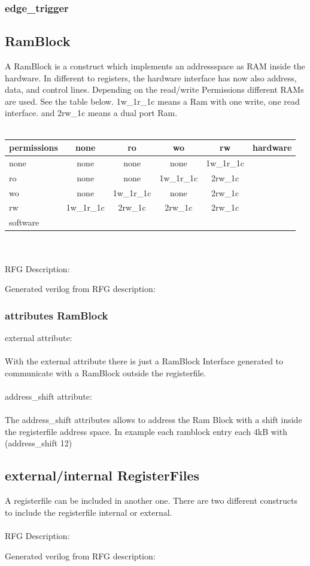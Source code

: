 \documentclass[12pt,a4paper]{article}
\begin{document}
\subsubsection{edge\_trigger}

\subsection{RamBlock}
A RamBlock is a construct which implements an addressspace as RAM inside the hardware. In different to registers, the hardware interface has now also address, data, and control lines. Depending on the read/write Permissions different RAMs are used. See the table below. 1w\_1r\_1c means a Ram with one write, one read interface. and 2rw\_1c means a dual port Ram.\\
\\
\begin{tabular}{ l || c | c | c | c | r }
    permissions & none & ro & wo & rw & hardware\\ \hline\hline
    none & none & none & none & 1w\_1r\_1c \\ \cline{1-5}
    ro & none & none & 1w\_1r\_1c& 2rw\_1c\\ \cline{1-5}
    wo & none & 1w\_1r\_1c& none & 2rw\_1c\\ \cline{1-5}
    rw & 1w\_1r\_1c& 2rw\_1c& 2rw\_1c & 2rw\_1c\\ \cline{1-5}
    software \\
\end{tabular}
\\
\\
RFG Description:
 
\newpage
Generated verilog from RFG description:

\newpage
\subsubsection{attributes RamBlock}
external attribute:\\
\\
With the external attribute there is just a RamBlock Interface generated to communicate with a RamBlock outside the registerfile.\\
\\
address\_shift attribute:\\
\\
The address\_shift attributes allows to address the Ram Block with a shift inside the registerfile address space. In example each ramblock entry each 4kB with (address\_shift 12)
\newpage
\subsection{external/internal RegisterFiles}
A registerfile can be included in another one. There are two different constructs to include the registerfile internal or external.\\
\\
RFG Description:

\newpage
Generated verilog from RFG description:
\newpage
\end{document}
